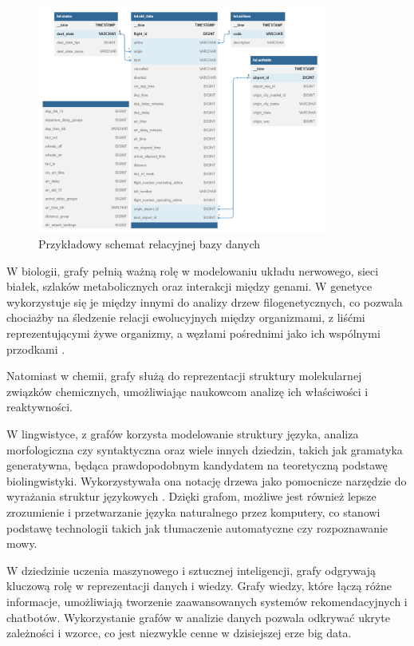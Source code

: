 \begin{figure}[ht]
	\centering
	\includegraphics[height=7.5cm]{partials/images/intro_database.png}
	\caption{Przykładowy schemat relacyjnej bazy danych}
    \label{Fig:intro-2}
\end{figure}

W biologii, grafy pełnią ważną rolę w modelowaniu układu nerwowego, sieci białek,
szlaków metabolicznych oraz interakcji między genami.
W genetyce wykorzystuje się je między innymi do analizy drzew filogenetycznych,
co pozwala chociażby na śledzenie relacji ewolucyjnych między organizmami,
z liśćmi reprezentującymi żywe organizmy, a węzłami pośrednimi jako ich wspólnymi przodkami \cite{Erciyes2023}.

Natomiast w chemii, grafy służą do reprezentacji struktury molekularnej związków chemicznych,
umożliwiając naukowcom analizę ich właściwości i reaktywności.

W lingwistyce, z grafów korzysta modelowanie struktury języka, analiza morfologiczna czy syntaktyczna oraz wiele innych dziedzin,
takich jak gramatyka generatywna, będąca prawdopodobnym kandydatem na teoretyczną podstawę biolingwistyki.
Wykorzystywała ona notację drzewa jako pomocnicze narzędzie do wyrażania struktur językowych \cite{Arikawa2019}.
Dzięki grafom, możliwe jest również lepsze zrozumienie i przetwarzanie języka naturalnego przez komputery,
co stanowi podstawę technologii takich jak tłumaczenie automatyczne czy rozpoznawanie mowy.

W dziedzinie uczenia maszynowego i sztucznej inteligencji, grafy odgrywają kluczową rolę w reprezentacji danych i wiedzy.
Grafy wiedzy, które łączą różne informacje, umożliwiają tworzenie zaawansowanych systemów rekomendacyjnych i chatbotów.
Wykorzystanie grafów w analizie danych pozwala odkrywać ukryte zależności i wzorce, co jest niezwykle cenne w dzisiejszej erze big data.

